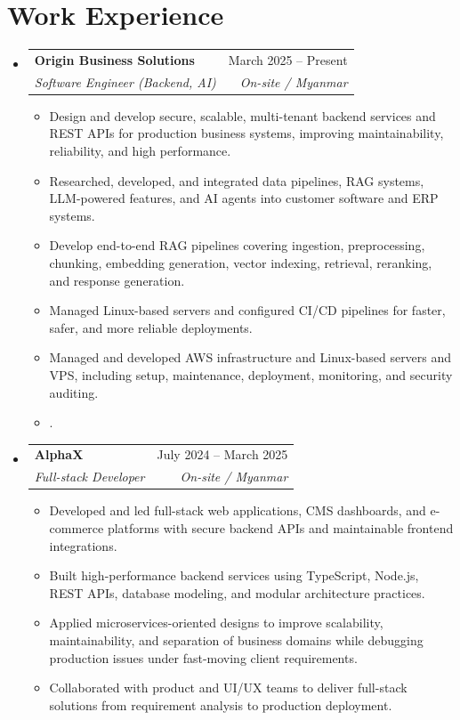 \documentclass[letterpaper,11pt]{article}
\makeatletter
\newcommand{\resumeItem}[1]{
  \item\small{#1 \vspace{-2pt}}
}
\newcommand{\resumeSubheading}[4]{
  \vspace{-2pt}\item
    \begin{tabular*}{0.97\textwidth}[t]{l@{\extracolsep{\fill}}r}
      \textbf{#1} & #2 \\
      \textit{\small#3} & \textit{\small #4} \\
    \end{tabular*}\vspace{-7pt}
}
\newcommand{\resumeSubHeadingListStart}{\begin{itemize}[leftmargin=0.15in, label={}]}
\newcommand{\resumeSubHeadingListEnd}{\end{itemize}}
\newcommand{\resumeItemListStart}{\begin{itemize}}
\newcommand{\resumeItemListEnd}{\end{itemize}\vspace{-5pt}}
\makeatother
\begin{document}
\section{Work Experience}
  \resumeSubHeadingListStart

    \resumeSubheading
      {Origin Business Solutions}{March 2025 -- Present}
      {Software Engineer (Backend, AI)}{On-site / Myanmar}
      \resumeItemListStart
        \resumeItem{Design and develop secure, scalable, multi-tenant backend services and REST APIs for production business systems, improving maintainability, reliability, and high performance.}
        \resumeItem{Researched, developed, and integrated data pipelines, RAG systems, LLM-powered features, and AI agents into customer software and ERP systems.}
        \resumeItem{Develop end-to-end RAG pipelines covering ingestion, preprocessing, chunking, embedding generation, vector indexing, retrieval, reranking, and response generation.}
        \resumeItem{Managed Linux-based servers and configured CI/CD pipelines for faster, safer, and more reliable deployments.}
        \resumeItem{Managed and developed AWS infrastructure and Linux-based servers and VPS, including setup, maintenance, deployment, monitoring, and security auditing.}
        \resumeItem{.}
      \resumeItemListEnd

    \resumeSubheading
      {AlphaX}{July 2024 -- March 2025}
      {Full-stack Developer}{On-site / Myanmar}
      \resumeItemListStart
        \resumeItem{Developed and led full-stack web applications, CMS dashboards, and e-commerce platforms with secure backend APIs and maintainable frontend integrations.}
        \resumeItem{Built high-performance backend services using TypeScript, Node.js, REST APIs, database modeling, and modular architecture practices.}
        \resumeItem{Applied microservices-oriented designs to improve scalability, maintainability, and separation of business domains while debugging production issues under fast-moving client requirements.}
        \resumeItem{Collaborated with product and UI/UX teams to deliver full-stack solutions from requirement analysis to production deployment.}
      \resumeItemListEnd

  \resumeSubHeadingListEnd

\end{document}
